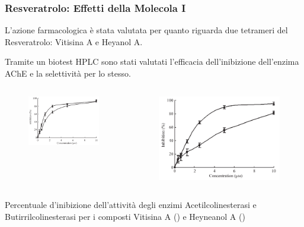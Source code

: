 \documentclass[9pt]{beamer}
\begin{document}
\begin{frame}
	\frametitle{Resveratrolo: Effetti della Molecola I}
	L'azione farmacologica è stata valutata per quanto riguarda due tetrameri del Resveratrolo: Vitisina A e Heyanol A.

	Tramite un biotest HPLC sono stati valutati l'efficacia dell'inibizione dell'enzima AChE e la selettività per lo stesso.

	\begin{columns}
		\begin{column}{0.5\textwidth}
			\begin{figure}
				\includegraphics[width=\textwidth]{immagini/risache_resveratrolo.png}
			\end{figure}
		\end{column}
		\begin{column}{0.5\textwidth}
			\begin{figure}
				\includegraphics[width=\textwidth]{immagini/risbuche_resveratrolo.png}
			\end{figure}
		\end{column}
	\end{columns}
	Percentuale d'inibizione dell'attività degli enzimi Acetilcolinesterasi e Butirrilcolinesterasi per i composti Vitisina A () e Heyneanol A ()
\end{frame}
\end{document}
